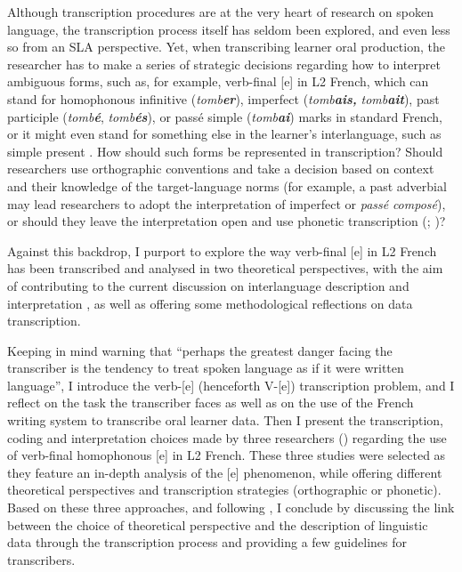 \documentclass[output=paper,colorlinks,citecolor=brown,modfonts,nonflat]{../langscibook}
\begin{document}
\largerpage
Although transcription procedures are at the very heart of research on spoken language, the transcription process itself has seldom been explored, and even less so from an SLA perspective. Yet, when transcribing learner oral production, the researcher has to make a series of strategic decisions regarding how to interpret ambiguous forms, such as, for example, verb-final [e] in L2 French, which can stand for homophonous infinitive (\textit{tomb}\textbf{\textit{er}}), imperfect (\textit{tomb}\textbf{\textit{ais,} }\textit{tomb}\textbf{\textit{ait}}), past participle (\textit{tomb}\textbf{\textit{é}},\textbf{ }\textit{tomb}\textbf{\textit{és}}), or passé simple (\textit{tomb}\textbf{\textit{ai}}) marks in standard French, or it might even stand for something else in the learner’s interlanguage, such as simple present \citep{Granget2015}. How should such forms be represented in transcription? Should  researchers use orthographic conventions and take a decision based on context and their knowledge of the target-language norms (for example, a past adverbial may lead researchers to adopt the interpretation of imperfect or \textit{passé} \textit{composé}), or should they leave the interpretation open and use phonetic transcription (\citealt[19]{MacWhinney2000}; \citealt{Saturno2015})? 

Against this backdrop, I purport to explore the way verb-final [e] in L2 French has been transcribed and analysed in two theoretical perspectives, with the aim of contributing to the current discussion on interlanguage description and interpretation \citep{Ortega2014trying}, as well as offering some methodological reflections on data transcription.

Keeping in mind  warning that “perhaps the greatest danger facing the transcriber is the tendency to treat spoken language as if it were written language”, I introduce the verb-[e] (henceforth V-[e]) transcription problem, and I reflect on the task the transcriber faces as well as on the use of the French writing system to transcribe oral learner data. Then I present the transcription, coding and interpretation choices made by three researchers (\citealt{Herschensohn2001,Prévost2007French, Prévost2007English,Granget2015}) regarding the use of verb-final homophonous [e] in L2 French. These three studies were selected as they feature an in-depth analysis of the [e] phenomenon, while offering different theoretical perspectives and transcription strategies (orthographic or phonetic). Based on these three approaches, and following \citet{Ortega2014trying}, I conclude by discussing the link between the choice of theoretical perspective and the description of linguistic data through the transcription process and providing a few guidelines for transcribers.
\end{document}
